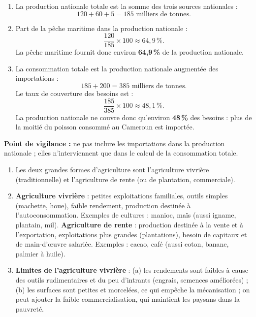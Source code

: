 \documentclass[11pt]{article}
\newcommand{\cle}[1]{{\popxbold\color{popdark}#1}}
\begin{document}
\begin{corrige}
\begin{enumerate}
\item La production nationale totale est la somme des trois sources nationales :
\[ 120 + 60 + 5 = 185 \text{ milliers de tonnes.} \]
\item Part de la pêche maritime dans la production nationale :
\[ \frac{120}{185} \times 100 \approx 64,9\,\%. \]
La pêche maritime fournit donc environ \textbf{64,9\,\%} de la production nationale.
\item La consommation totale est la production nationale augmentée des importations :
\[ 185 + 200 = 385 \text{ milliers de tonnes.} \]
Le taux de couverture des besoins est :
\[ \frac{185}{385} \times 100 \approx 48,1\,\%. \]
La production nationale ne couvre donc qu'environ \textbf{48\,\%} des besoins : plus de la moitié du poisson consommé au Cameroun est importée.
\end{enumerate}
\textbf{Point de vigilance :} ne pas inclure les importations dans la production nationale ; elles n'interviennent que dans le calcul de la consommation totale.
\end{corrige}

\begin{corrige}
\begin{enumerate}
\item Les deux grandes formes d'agriculture sont l'\cle{agriculture vivrière} (traditionnelle) et l'\cle{agriculture de rente} (ou de plantation, commerciale).
\item \textbf{Agriculture vivrière} : petites exploitations familiales, outils simples (machette, houe), faible rendement, production destinée à l'autoconsommation. Exemples de cultures : manioc, maïs (aussi igname, plantain, mil).
\textbf{Agriculture de rente} : production destinée à la vente et à l'exportation, exploitations plus grandes (plantations), besoin de capitaux et de main-d'œuvre salariée. Exemples : cacao, café (aussi coton, banane, palmier à huile).
\item \textbf{Limites de l'agriculture vivrière} : (a) les rendements sont faibles à cause des outils rudimentaires et du peu d'intrants (engrais, semences améliorées) ; (b) les surfaces sont petites et morcelées, ce qui empêche la mécanisation ; on peut ajouter la faible commercialisation, qui maintient les paysans dans la pauvreté.
\end{enumerate}
\end{corrige}
\end{document}
